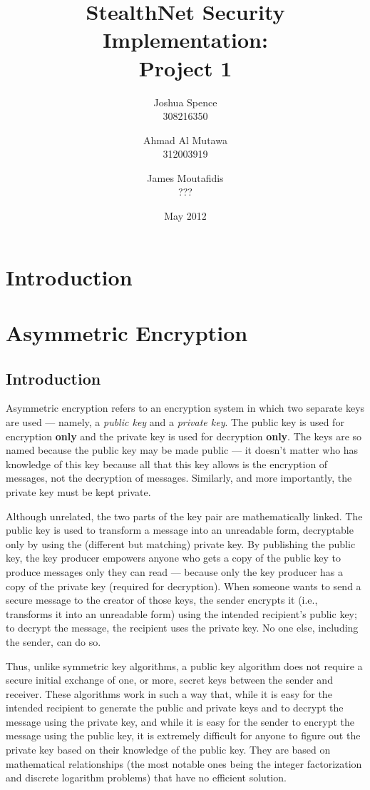 \documentclass[a4paper,11pt]{article}
\title{StealthNet Security Implementation: \\ Project 1}
\author{Joshua Spence \\ 308216350 \and Ahmad Al Mutawa \\ 312003919 \and James Moutafidis \\ ???}
\date{May 2012}
\begin{document}
\maketitle

\section{Introduction}

\section{Asymmetric Encryption}

\subsection{Introduction}
Asymmetric encryption refers to an encryption system in which two separate keys 
are used --- namely, a \emph{public key} and a \emph{private key}. The public 
key is used for encryption \textbf{only} and the private key is used for
decryption \textbf{only}. The keys are so named because the public key may be 
made public --- it doesn't matter who has knowledge of this key because all that
this key allows is the encryption of messages, not the decryption of messages. 
Similarly, and more importantly, the private key must be kept private.

Although unrelated, the two parts of the key pair are mathematically linked. The
public key is used to transform a message into an unreadable form, decryptable 
only by using the (different but matching) private key. By publishing the public
key, the key producer empowers anyone who gets a copy of the public key to 
produce messages only they can read --- because only the key producer has a copy
of the private key (required for decryption). When someone wants to send a 
secure message to the creator of those keys, the sender encrypts it (i.e., 
transforms it into an unreadable form) using the intended recipient's public 
key; to decrypt the message, the recipient uses the private key. No one else, 
including the sender, can do so.

Thus, unlike symmetric key algorithms, a public key algorithm does not require a
secure initial exchange of one, or more, secret keys between the sender and 
receiver. These algorithms work in such a way that, while it is easy for the 
intended recipient to generate the public and private keys and to decrypt the 
message using the private key, and while it is easy for the sender to encrypt 
the message using the public key, it is extremely difficult for anyone to figure
out the private key based on their knowledge of the public key. They are based 
on mathematical relationships (the most notable ones being the integer 
factorization and discrete logarithm problems) that have no efficient solution.
\end{document}
